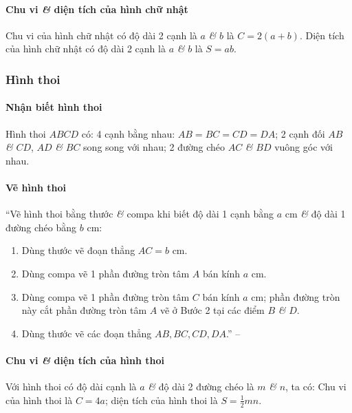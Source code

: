 \documentclass{article}
\numberwithin{equation}{section}
\begin{document}
\paragraph{Chu vi \textit{\&} diện tích của hình chữ nhật}
Chu vi của hình chữ nhật có độ dài 2 cạnh là $a$ \textit{\&} $b$ là $C = 2(a + b)$. Diện tích của hình chữ nhật có độ dài 2 cạnh là $a$ \textit{\&} $b$ là $S = ab$.

\subsubsection{Hình thoi}

\paragraph{Nhận biết hình thoi}
Hình thoi $ABCD$ có: 4 cạnh bằng nhau: $AB = BC = CD = DA$; 2 cạnh đối $AB$ \textit{\&} $CD$, $AD$ \textit{\&} $BC$ song song với nhau; 2 đường chéo $AC$ \textit{\&} $BD$ vuông góc với nhau.

\paragraph{Vẽ hình thoi}
``Vẽ hình thoi bằng thước \textit{\&} compa khi biết độ dài 1 cạnh bằng $a$ cm \textit{\&} độ dài 1 đường chéo bằng $b$ cm:
\begin{enumerate}
	\item Dùng thước vẽ đoạn thẳng $AC = b$ cm.
	\item Dùng compa vẽ 1 phần đường tròn tâm $A$ bán kính $a$ cm.
	\item Dùng compa vẽ 1 phần đường tròn tâm $C$ bán kính $a$ cm; phần đường tròn này cắt phần đường tròn tâm $A$ vẽ ở Bước 2 tại các điểm $B$ \textit{\&} $D$.
	\item Dùng thước vẽ các đoạn thẳng $AB,BC,CD,DA$.'' -- \cite[p. 100]{SGK_Toan_6_Canh_Dieu_tap_1}
\end{enumerate}

\paragraph{Chu vi \textit{\&} diện tích của hình thoi}
Với hình thoi có độ dài cạnh là $a$ \textit{\&} độ dài 2 đường chéo là $m$ \textit{\&} $n$, ta có: Chu vi của hình thoi là $C = 4a$; diện tích của hình thoi là $S = \frac{1}{2}mn$.

\end{document}
